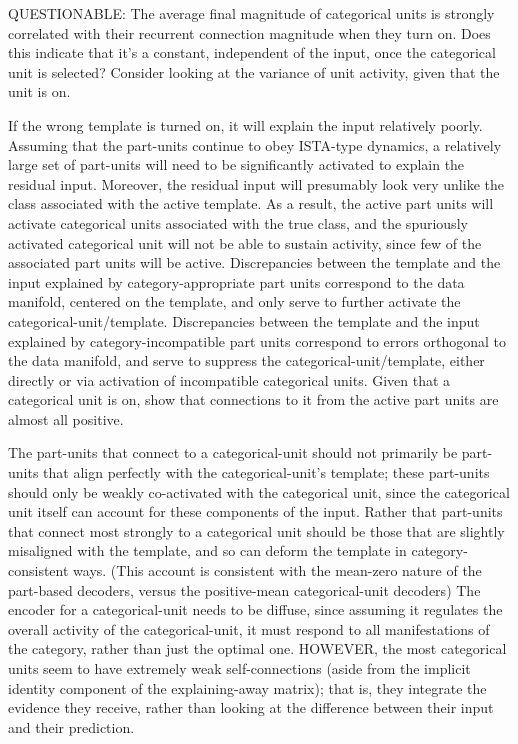 QUESTIONABLE: The average final magnitude of categorical units is strongly correlated with their recurrent connection magnitude when they turn on.  Does this indicate that it's a constant, independent of the input, once the categorical unit is selected?  Consider looking at the variance of unit activity, given that the unit is on.  

If the wrong template is turned on, it will explain the input relatively poorly.  Assuming that the part-units continue to obey ISTA-type dynamics, a relatively large set of part-units will need to be significantly activated to explain the residual input.  Moreover, the residual input will presumably look very unlike the class associated with the active template.  As a result, the active part units will activate categorical units associated with the true class, and the spuriously activated categorical unit will not be able to sustain activity, since few of the associated part units will be active.  Discrepancies between the template and the input explained by category-appropriate part units correspond to the data manifold, centered on the template, and only serve to further activate the categorical-unit/template.  Discrepancies between the template and the input explained by category-incompatible part units correspond to errors orthogonal to the data manifold, and serve to suppress the categorical-unit/template, either directly or via activation of incompatible categorical units.  Given that a categorical unit is on, show that connections to it from the active part units are almost all positive.

The part-units that connect to a categorical-unit should not primarily be part-units that align perfectly with the categorical-unit's template; these part-units should only be weakly co-activated with the categorical unit, since the categorical unit itself can account for these components of the input.  Rather that part-units that connect most strongly to a categorical unit should be those that are slightly misaligned with the template, and so can deform the template in category-consistent ways.  (This account is consistent with the mean-zero nature of the part-based decoders, versus the positive-mean categorical-unit decoders)  The encoder for a categorical-unit needs to be diffuse, since assuming it regulates the overall activity of the categorical-unit, it must respond to all manifestations of the category, rather than just the optimal one.  HOWEVER, the most categorical units seem to have extremely weak self-connections (aside from the implicit identity component of the explaining-away matrix); that is, they integrate the evidence they receive, rather than looking at the difference between their input and their prediction.

